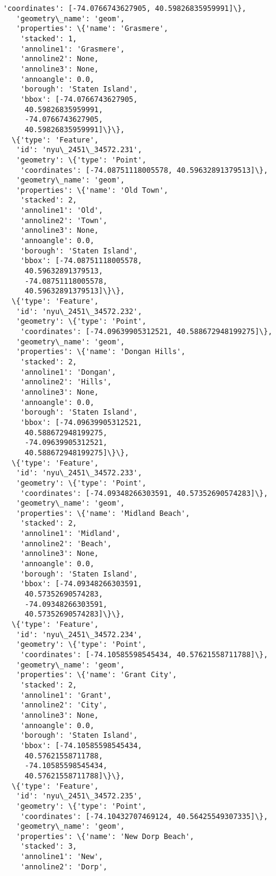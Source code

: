 \documentclass[11pt]{article}
\begin{document}
\begin{tcolorbox}[breakable, size=fbox, boxrule=.5pt, pad at break*=1mm, opacityfill=0]
\begin{Verbatim}[commandchars=\\\{\}]
    'coordinates': [-74.0766743627905, 40.59826835959991]\},
   'geometry\_name': 'geom',
   'properties': \{'name': 'Grasmere',
    'stacked': 1,
    'annoline1': 'Grasmere',
    'annoline2': None,
    'annoline3': None,
    'annoangle': 0.0,
    'borough': 'Staten Island',
    'bbox': [-74.0766743627905,
     40.59826835959991,
     -74.0766743627905,
     40.59826835959991]\}\},
  \{'type': 'Feature',
   'id': 'nyu\_2451\_34572.231',
   'geometry': \{'type': 'Point',
    'coordinates': [-74.08751118005578, 40.59632891379513]\},
   'geometry\_name': 'geom',
   'properties': \{'name': 'Old Town',
    'stacked': 2,
    'annoline1': 'Old',
    'annoline2': 'Town',
    'annoline3': None,
    'annoangle': 0.0,
    'borough': 'Staten Island',
    'bbox': [-74.08751118005578,
     40.59632891379513,
     -74.08751118005578,
     40.59632891379513]\}\},
  \{'type': 'Feature',
   'id': 'nyu\_2451\_34572.232',
   'geometry': \{'type': 'Point',
    'coordinates': [-74.09639905312521, 40.588672948199275]\},
   'geometry\_name': 'geom',
   'properties': \{'name': 'Dongan Hills',
    'stacked': 2,
    'annoline1': 'Dongan',
    'annoline2': 'Hills',
    'annoline3': None,
    'annoangle': 0.0,
    'borough': 'Staten Island',
    'bbox': [-74.09639905312521,
     40.588672948199275,
     -74.09639905312521,
     40.588672948199275]\}\},
  \{'type': 'Feature',
   'id': 'nyu\_2451\_34572.233',
   'geometry': \{'type': 'Point',
    'coordinates': [-74.09348266303591, 40.57352690574283]\},
   'geometry\_name': 'geom',
   'properties': \{'name': 'Midland Beach',
    'stacked': 2,
    'annoline1': 'Midland',
    'annoline2': 'Beach',
    'annoline3': None,
    'annoangle': 0.0,
    'borough': 'Staten Island',
    'bbox': [-74.09348266303591,
     40.57352690574283,
     -74.09348266303591,
     40.57352690574283]\}\},
  \{'type': 'Feature',
   'id': 'nyu\_2451\_34572.234',
   'geometry': \{'type': 'Point',
    'coordinates': [-74.10585598545434, 40.57621558711788]\},
   'geometry\_name': 'geom',
   'properties': \{'name': 'Grant City',
    'stacked': 2,
    'annoline1': 'Grant',
    'annoline2': 'City',
    'annoline3': None,
    'annoangle': 0.0,
    'borough': 'Staten Island',
    'bbox': [-74.10585598545434,
     40.57621558711788,
     -74.10585598545434,
     40.57621558711788]\}\},
  \{'type': 'Feature',
   'id': 'nyu\_2451\_34572.235',
   'geometry': \{'type': 'Point',
    'coordinates': [-74.10432707469124, 40.56425549307335]\},
   'geometry\_name': 'geom',
   'properties': \{'name': 'New Dorp Beach',
    'stacked': 3,
    'annoline1': 'New',
    'annoline2': 'Dorp',

\end{Verbatim}
\end{tcolorbox}
\end{document}
